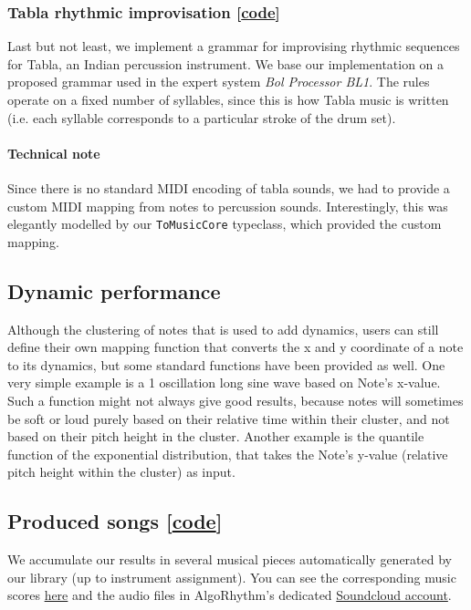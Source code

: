 \documentclass[11pt,a4paper]{article}
\newcommand{\icode}[1]{\texttt{#1}}
\begin{document}
\subsubsection{Tabla rhythmic improvisation [\href{https://github.com/omelkonian/AlgoRhythm/blob/master/AlgoRhythm/src/Grammar/Tabla.hs}{code}]}
Last but not least, we implement a grammar for improvising rhythmic sequences for Tabla, an Indian percussion instrument. We base our implementation on a proposed grammar used in the expert system \textit{Bol Processor BL1}\cite{tabla}. The rules operate on a fixed number of syllables, since this is how Tabla music is written (i.e. each syllable corresponds to a particular stroke of the drum set).\vspace{-3mm}
\paragraph{Technical note} Since there is no standard MIDI encoding of tabla sounds, we had to provide a custom MIDI mapping from notes to percussion sounds. Interestingly, this was elegantly modelled by our \icode{ToMusicCore} typeclass, which provided the custom mapping.

\subsection{Dynamic performance}
Although the clustering of notes that is used to add dynamics, users can still define their own mapping function that converts the x and y coordinate of a note to its dynamics, but some standard functions have been provided as well. One very simple example is a 1 oscillation long sine wave based on Note's x-value. Such a function might not always give good results, because notes will sometimes be soft or loud purely based on their relative time within their cluster, and not based on their pitch height in the cluster. Another example is the quantile function of the exponential distribution, that takes the Note's y-value (relative pitch height within the cluster) as input.

\subsection{Produced songs [\href{https://github.com/omelkonian/AlgoRhythm/blob/master/AlgoRhythm/app/Main.hs}{code}]} We accumulate our results in several musical pieces automatically generated by our library (up to instrument assignment). You can see the corresponding music scores \href{https://github.com/omelkonian/AlgoRhythm/tree/master/output}{here} and the audio files in AlgoRhythm's dedicated \href{https://soundcloud.com/algo-rhythm-haskell/sets}{Soundcloud account}.
\end{document}
